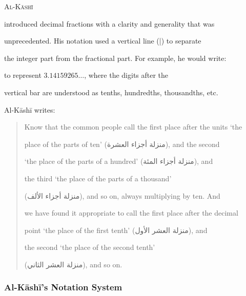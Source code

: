 \documentclass[11pt,a4paper]{article}
\newcommand{\ar}[1]{{\arabicfont\beginR #1\endR}}
\begin{document}
\vspace{0.3cm}



\lettrine[lines=3, nindent=0em, findent=3pt]{\color{chapcolor}A}{l-K\=ash\=i}

introduced decimal fractions with a clarity and generality that was

unprecedented. His notation used a vertical line (\ar{|}) to separate

the integer part from the fractional part. For example, he would write:



\begin{center}


\end{center}



\noindent to represent $3.14159265\ldots$, where the digits after the

vertical bar are understood as tenths, hundredths, thousandths, etc.



Al-K\=ash\=i writes:



\begin{quote}

Know that the common people call the first place after the units `the

place of the parts of ten' (\ar{منزلة أجزاء العشرة}), and the second

`the place of the parts of a hundred' (\ar{منزلة أجزاء المئة}), and

the third `the place of the parts of a thousand'

(\ar{منزلة أجزاء الألف}), and so on, always multiplying by ten. And

we have found it appropriate to call the first place after the decimal

point `the place of the first tenth' (\ar{منزلة العشر الأول}), and

the second `the place of the second tenth'

(\ar{منزلة العشر الثاني}), and so on.

\end{quote}



\subsubsection{Al-K\=ash\=i's Notation System}
\end{document}

